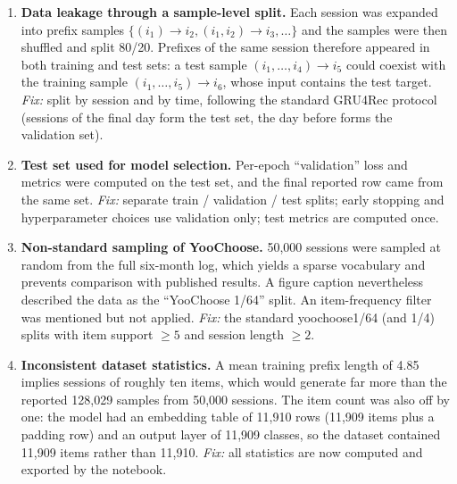 \begin{enumerate}[leftmargin=*]
  \item \textbf{Data leakage through a sample-level split.}
        Each session was expanded into prefix samples
        $\{(i_1)\!\to\! i_2, (i_1,i_2)\!\to\! i_3,\ldots\}$ and the samples were
        then shuffled and split 80/20. Prefixes of the same session therefore
        appeared in both training and test sets: a test sample
        $(i_1,\ldots,i_4)\!\to\! i_5$ could coexist with the training sample
        $(i_1,\ldots,i_5)\!\to\! i_6$, whose input contains the test target.
        \emph{Fix:} split by session and by time, following the standard
        GRU4Rec protocol (sessions of the final day form the test set, the day
        before forms the validation set).

  \item \textbf{Test set used for model selection.}
        Per-epoch ``validation'' loss and metrics were computed on the test set,
        and the final reported row came from the same set.
        \emph{Fix:} separate train / validation / test splits; early stopping and
        hyperparameter choices use validation only; test metrics are computed
        once.

  \item \textbf{Non-standard sampling of YooChoose.}
        50{,}000 sessions were sampled at random from the full six-month log,
        which yields a sparse vocabulary and prevents comparison with published
        results. A figure caption nevertheless described the data as the
        ``YooChoose 1/64'' split. An item-frequency filter was mentioned but not
        applied.
        \emph{Fix:} the standard yoochoose1/64 (and 1/4) splits with item support
        $\geq 5$ and session length $\geq 2$.

  \item \textbf{Inconsistent dataset statistics.}
        A mean training prefix length of 4.85 implies sessions of roughly ten
        items, which would generate far more than the reported 128{,}029 samples
        from 50{,}000 sessions. The item count was also off by one: the model had
        an embedding table of 11{,}910 rows (11{,}909 items plus a padding row)
        and an output layer of 11{,}909 classes, so the dataset contained
        11{,}909 items rather than 11{,}910.
        \emph{Fix:} all statistics are now computed and exported by the notebook.


\end{enumerate}
